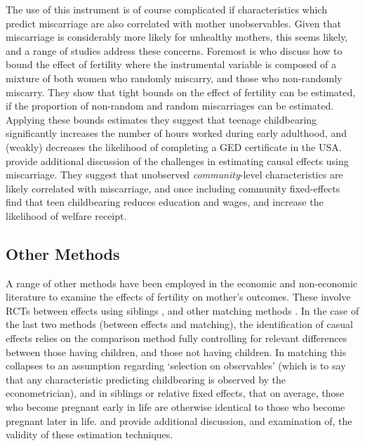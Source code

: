 The use of this instrument is of course complicated if characteristics which
predict miscarriage are also correlated with mother unobservables. Given that
miscarriage is considerably more likely for unhealthy mothers, this seems likely,
and a range of studies address these concerns.  Foremost is \citet{Hotzetal1997} 
who discuss how to bound the effect of fertility where the instrumental variable
is composed of a mixture of both women who randomly miscarry, and those who 
non-randomly miscarry.  They show that tight bounds on the effect of fertility can 
be estimated, if the proportion of non-random and random miscarriages can be
estimated.  Applying these bounds estimates they suggest that teenage childbearing
significantly increases the number of hours worked during early adulthood, and
(weakly) decreases the likelihood of completing a GED certificate in the USA.
\citet{FletcherWolfe2009} provide additional discussion of the challenges in
estimating causal effects using miscarriage.  They suggest that unobserved
\emph{community}-level characteristics are likely correlated with miscarriage, 
and once including community fixed-effects find that teen childbearing reduces
education and wages, and increase the likelihood of welfare receipt.


\subsection{Other Methods}
A range of other methods have been employed in the economic and non-economic
literature to examine the effects of fertility on mother's outcomes. These involve
RCTs \citep{DiCensoetal2002} between effects using siblings \citep{Holmlund2005,
GeronimusKorenman1992,Ribar1999}, and other matching methods 
\citep{ChevalierViitanen2003,LevinePainter2003}.  In the case of the last two
methods (between effects and matching), the identification of casual effects
relies on the comparison method fully controlling for relevant differences between
those having children, and those not having children.  In matching this collapses
to an assumption regarding `selection on observables' (which is to say that any
characteristic predicting childbearing is observed by the econometrician), and in
siblings or relative fixed effects, that on average, those who become pregnant
early in life are otherwise identical to those who become pregnant later in life.
\citet{Ribar1999} and \citet{RosenzweigSchultz1985} provide additional discussion, 
and examination of, the validity of these estimation techniques.

